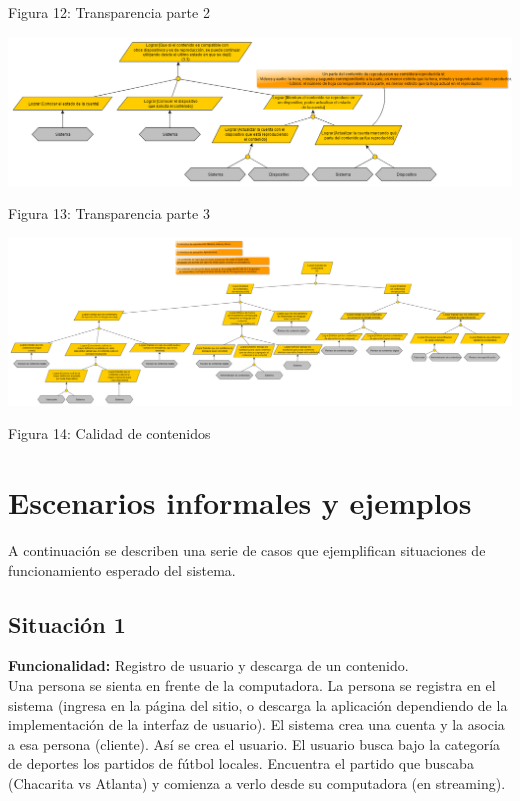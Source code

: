 \documentclass[11pt, a4paper, spanish]{article}
\begin{document}
	\begin{center}
		\small{Figura 12: Transparencia parte 2}
	\end{center}
\newpage
	\begin{center}
		\includegraphics[scale=0.43, angle=90]{Diagramas/3-3ModelodeObjetivosTransparencia.png}
	\end{center}
	\begin{center}
		\small{Figura 13: Transparencia parte 3}
	\end{center}
\newpage
	\begin{center}
		\includegraphics[scale=0.25, angle=90]{Diagramas/4ModelodeObjetivosCalidaddecontenidos.png}
	\end{center}
	\begin{center}
		\small{Figura 14: Calidad de contenidos}
	\end{center}
\newpage


\section{Escenarios informales y ejemplos}
	
	A continuaci\'on se describen una serie de casos que ejemplifican situaciones de funcionamiento esperado del sistema.

\subsection{Situaci\'on 1}

	\textbf{Funcionalidad:} Registro de usuario y descarga de un contenido.\\

        Una persona se sienta en frente de la computadora.
    La persona se registra en el sistema (ingresa en la p\'agina del sitio, o descarga 
    la aplicaci\'on dependiendo de la implementaci\'on  de la interfaz de usuario).
    El sistema crea una cuenta y la asocia a esa persona (cliente). As\'i se crea el usuario.
    El usuario busca bajo la categor\'ia de deportes los partidos de f\'utbol locales.
    Encuentra el partido que buscaba (Chacarita vs Atlanta) y comienza a verlo desde su computadora (en streaming).\\
\end{document}
